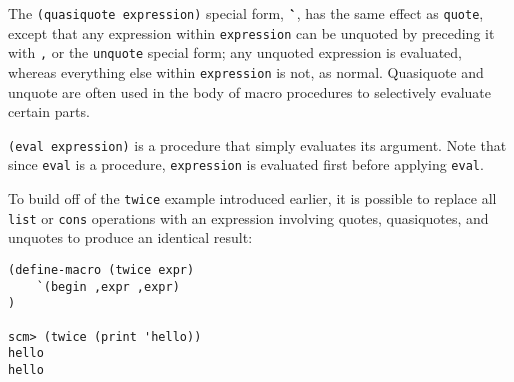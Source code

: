 The \texttt{(quasiquote expression)} special form, \textbf{\`}, has the same effect as \texttt{quote}, except that any expression within \texttt{expression} can be unquoted by preceding it with \texttt{,} or the \texttt{unquote} special form; any unquoted expression is evaluated, whereas everything else within \texttt{expression} is not, as normal. Quasiquote and unquote are often used in the body of macro procedures to selectively evaluate certain parts. 

\texttt{(eval expression)} is a procedure that simply evaluates its argument. Note that since \texttt{eval} is a procedure, \texttt{expression} is evaluated first before applying \texttt{eval}.

To build off of the \texttt{twice} example introduced earlier, it is possible to replace all \texttt{list} or \texttt{cons} operations with an expression involving quotes, quasiquotes, and unquotes to produce an identical result:

\begin{lstlisting}
(define-macro (twice expr)
    `(begin ,expr ,expr)
)

scm> (twice (print 'hello))
hello
hello
\end{lstlisting}

